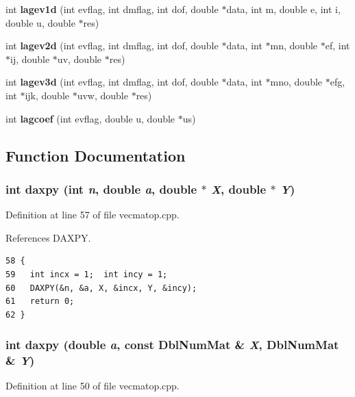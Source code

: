 \begin{CompactItemize}
\item 
int {\bf lagev1d} (int evflag, int dmflag, int dof, double $\ast$data, int m, double e, int i, double u, double $\ast$res)
\item 
int {\bf lagev2d} (int evflag, int dmflag, int dof, double $\ast$data, int $\ast$mn, double $\ast$ef, int $\ast$ij, double $\ast$uv, double $\ast$res)
\item 
int {\bf lagev3d} (int evflag, int dmflag, int dof, double $\ast$data, int $\ast$mno, double $\ast$efg, int $\ast$ijk, double $\ast$uvw, double $\ast$res)
\item 
int {\bf lagcoef} (int evflag, double u, double $\ast$us)
\end{CompactItemize}


\subsection{Function Documentation}
\subsubsection{\setlength{\rightskip}{0pt plus 5cm}int daxpy (int {\em n}, double {\em a}, double $\ast$ {\em X}, double $\ast$ {\em Y})}\label{vecmatop_8cpp_42f36f4fc8b532e752c7329e335ac044_42f36f4fc8b532e752c7329e335ac044}




Definition at line 57 of file vecmatop.cpp.

References DAXPY.

\footnotesize\begin{verbatim}58 {
59   int incx = 1;  int incy = 1;
60   DAXPY(&n, &a, X, &incx, Y, &incy);
61   return 0;
62 }
\end{verbatim}\normalsize 


\subsubsection{\setlength{\rightskip}{0pt plus 5cm}int daxpy (double {\em a}, const {\bf Dbl\-Num\-Mat} \& {\em X}, {\bf Dbl\-Num\-Mat} \& {\em Y})}\label{vecmatop_8cpp_9e02e7b9fbd857494e5ee749480735cf_9e02e7b9fbd857494e5ee749480735cf}




Definition at line 50 of file vecmatop.cpp.

